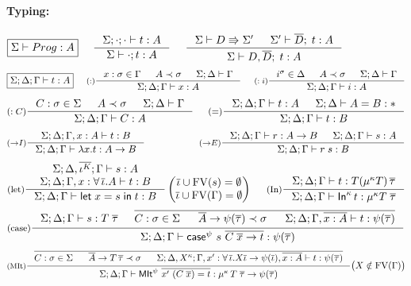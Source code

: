\begin{figure}
\begin{framed}
\paragraph{Typing:}
\[ \fbox{$\Sigma |- Prog : A$}
 ~~~~
   \inference[]{\Sigma;\cdot;\cdot |- t:A}
               {\Sigma |- \cdot;t : A}
 ~~~~
   \inference[]{ \Sigma |- D \Rrightarrow \Sigma'
               & \Sigma' |- \overline{D};\; t : A}
               {\Sigma |- D,\overline{D};\; t : A}
\]
\[ \fbox{$\Sigma;\Delta;\Gamma |- t : A$}
 ~~~~
   \inference[($:$)]
      {x:\sigma \in \Gamma & A\prec\sigma & \Sigma;\Delta |- \Gamma} 
      {\Sigma;\Delta;\Gamma |- x:A}
 ~~~~
   \inference[($:i$)]
      {i^\sigma \in \Delta & A\prec\sigma & \Sigma;\Delta |- \Gamma} 
      {\Sigma;\Delta;\Gamma |- i:A}
\]
\[ \inference[($:C$)]
      {C:\sigma \in \Sigma & A\prec\sigma & \Sigma;\Delta |- \Gamma}
      {\Sigma;\Delta;\Gamma |- C:A}
 ~~~~
   \inference[($=$)]{\Sigma;\Delta;\Gamma |- t : A & \Sigma;\Delta |- A = B : *}
                    {\Sigma;\Delta;\Gamma |- t : B}
\]
\[ \inference[($->$$I$)]{\Sigma;\Delta;\Gamma,x:A |- t : B}
                        {\Sigma;\Delta;\Gamma |- \lambda x.t : A -> B}
 ~~~~ ~~~~ ~~~~ ~~~~
   \inference[($->$$E$)]{ \Sigma;\Delta;\Gamma |- r : A -> B
                        & \Sigma;\Delta;\Gamma |- s : A}
                        {\Sigma;\Delta;\Gamma |- r\;s : B}
\]
\[ \inference[(let)]
      { \Sigma;\Delta,\overline{\iota^K};\Gamma |- s : A \\
        \Sigma;\Delta;\Gamma,x:\forall\,\overline{\iota}.A |- t : B }
      {\Sigma;\Delta;\Gamma |- \Let{x}{s}{t} : B }
      \begin{pmatrix} \overline{\iota} \cup \FV(s) = \emptyset \\
                      \overline{\iota} \cup \FV(\Gamma) = \emptyset
      \end{pmatrix}
 ~~~~
   \inference[(In)]
      {\Sigma;\Delta;\Gamma |- t : T(\mu^\kappa T)\,\overline{\tau}}
      {\Sigma;\Delta;\Gamma |- \In^\kappa\,t : \mu^\kappa T\; \overline{\tau}}
\]
\[ \inference[(case)]
      { \Sigma;\Delta;\Gamma |- s : T\;\overline\tau
      & \overline{\begin{matrix}
          C:\sigma \in \Sigma ~&~
          \overline{A} -> \psi(\overline{\tau}) \prec \sigma ~&~
          \Sigma;\Delta;\Gamma,\overline{x:A} |- t : \psi(\overline\tau) 
        \end{matrix} }
      }
      {\Sigma;\Delta;\Gamma |- \case^\psi~s~\overline{C\;\overline{x} -> t}
                             : \psi(\overline\tau) }
\]
\[ \inference[(MIt)]
      { \overline{\begin{matrix}
        C:\sigma\in\Sigma ~&~ \overline{A} -> T\,\overline\tau \prec \sigma
      ~&~
        \Sigma;\Delta,X^{\kappa};
        \Gamma
            ,x':\forall\,\overline\iota.X\overline\iota -> \psi(\overline\iota)
            ,\overline{x:A}
          |- t : \psi(\overline\tau) \end{matrix} }
      }
      {\Sigma;\Delta;\Gamma
           |- \MIt^\psi ~ \overline{x' ~ (C\;\overline{x}) = t}
            : \mu^{\kappa}\,T\;\overline\tau -> \psi(\overline\tau) }
      \big( X\notin\FV(\Gamma) \big)
\]


\end{framed}
\end{figure}
